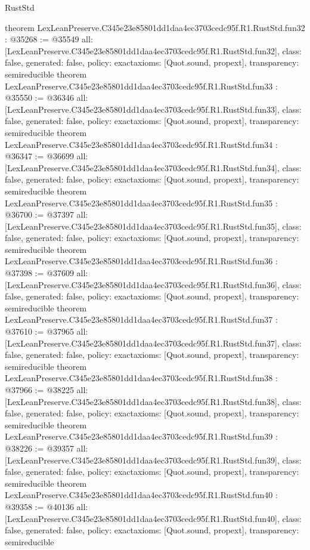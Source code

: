 \begin{lexlean}{RustStd}
\begin{coremodule}
{}
theorem LexLeanPreserve.C345e23e85801dd1daa4ec3703cedc95f.R1.RustStd.fun32 : @35268 := @35549 {
  all: [LexLeanPreserve.C345e23e85801dd1daa4ec3703cedc95f.R1.RustStd.fun32],
  class: false,
  generated: false,
  policy: exact{axioms: [Quot.sound, propext]},
  transparency: semireducible
}
theorem LexLeanPreserve.C345e23e85801dd1daa4ec3703cedc95f.R1.RustStd.fun33 : @35550 := @36346 {
  all: [LexLeanPreserve.C345e23e85801dd1daa4ec3703cedc95f.R1.RustStd.fun33],
  class: false,
  generated: false,
  policy: exact{axioms: [Quot.sound, propext]},
  transparency: semireducible
}
theorem LexLeanPreserve.C345e23e85801dd1daa4ec3703cedc95f.R1.RustStd.fun34 : @36347 := @36699 {
  all: [LexLeanPreserve.C345e23e85801dd1daa4ec3703cedc95f.R1.RustStd.fun34],
  class: false,
  generated: false,
  policy: exact{axioms: [Quot.sound, propext]},
  transparency: semireducible
}
theorem LexLeanPreserve.C345e23e85801dd1daa4ec3703cedc95f.R1.RustStd.fun35 : @36700 := @37397 {
  all: [LexLeanPreserve.C345e23e85801dd1daa4ec3703cedc95f.R1.RustStd.fun35],
  class: false,
  generated: false,
  policy: exact{axioms: [Quot.sound, propext]},
  transparency: semireducible
}
theorem LexLeanPreserve.C345e23e85801dd1daa4ec3703cedc95f.R1.RustStd.fun36 : @37398 := @37609 {
  all: [LexLeanPreserve.C345e23e85801dd1daa4ec3703cedc95f.R1.RustStd.fun36],
  class: false,
  generated: false,
  policy: exact{axioms: [Quot.sound, propext]},
  transparency: semireducible
}
theorem LexLeanPreserve.C345e23e85801dd1daa4ec3703cedc95f.R1.RustStd.fun37 : @37610 := @37965 {
  all: [LexLeanPreserve.C345e23e85801dd1daa4ec3703cedc95f.R1.RustStd.fun37],
  class: false,
  generated: false,
  policy: exact{axioms: [Quot.sound, propext]},
  transparency: semireducible
}
theorem LexLeanPreserve.C345e23e85801dd1daa4ec3703cedc95f.R1.RustStd.fun38 : @37966 := @38225 {
  all: [LexLeanPreserve.C345e23e85801dd1daa4ec3703cedc95f.R1.RustStd.fun38],
  class: false,
  generated: false,
  policy: exact{axioms: [Quot.sound, propext]},
  transparency: semireducible
}
theorem LexLeanPreserve.C345e23e85801dd1daa4ec3703cedc95f.R1.RustStd.fun39 : @38226 := @39357 {
  all: [LexLeanPreserve.C345e23e85801dd1daa4ec3703cedc95f.R1.RustStd.fun39],
  class: false,
  generated: false,
  policy: exact{axioms: [Quot.sound, propext]},
  transparency: semireducible
}
theorem LexLeanPreserve.C345e23e85801dd1daa4ec3703cedc95f.R1.RustStd.fun40 : @39358 := @40136 {
  all: [LexLeanPreserve.C345e23e85801dd1daa4ec3703cedc95f.R1.RustStd.fun40],
  class: false,
  generated: false,
  policy: exact{axioms: [Quot.sound, propext]},
  transparency: semireducible
}
\end{coremodule}
\end{lexlean}
